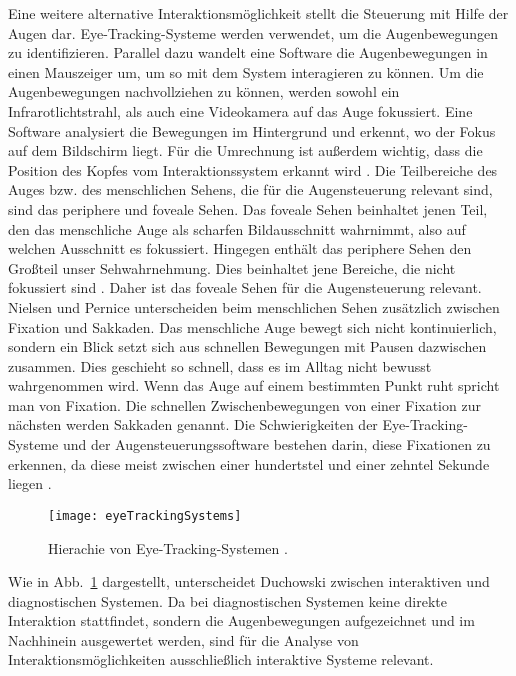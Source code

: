 Eine weitere alternative Interaktionsmöglichkeit stellt die Steuerung mit Hilfe der Augen dar. Eye-Tracking-Systeme werden verwendet, um die Augenbewegungen zu identifizieren. Parallel dazu wandelt eine Software die Augenbewegungen in einen Mauszeiger um, um so mit dem System interagieren zu können. 
\newline \newline
Um die Augenbewegungen nachvollziehen zu können, werden sowohl ein Infrarotlichtstrahl, als auch eine Videokamera auf das Auge fokussiert. Eine Software analysiert die Bewegungen im Hintergrund und erkennt, wo der Fokus auf dem Bildschirm liegt. Für die Umrechnung ist außerdem wichtig, dass die Position des Kopfes vom Interaktionssystem erkannt wird \cite{NielsenPernice}.
\newline \newline
Die Teilbereiche des Auges bzw. des menschlichen Sehens, die für die Augensteuerung relevant sind, sind das periphere und foveale Sehen. Das foveale Sehen beinhaltet jenen Teil, den das menschliche Auge als scharfen Bildausschnitt wahrnimmt, also auf \mbox{welchen} Ausschnitt es fokussiert. Hingegen enthält das periphere Sehen den Großteil unser Sehwahrnehmung. Dies beinhaltet jene Bereiche, die nicht fokussiert sind \cite{NielsenPernice}. Daher ist das foveale Sehen für die Augensteuerung relevant.
\newline \newline
Nielsen und Pernice \cite{NielsenPernice} unterscheiden beim menschlichen Sehen zusätzlich zwischen Fixation und Sakkaden. Das menschliche Auge bewegt sich nicht kontinuierlich, sondern ein Blick setzt sich aus schnellen Bewegungen mit Pausen dazwischen zusammen. Dies geschieht so schnell, dass es im Alltag nicht bewusst wahrgenommen wird. Wenn das Auge auf einem bestimmten Punkt ruht spricht man von Fixation. Die schnellen Zwischenbewegungen von einer Fixation zur nächsten werden Sakkaden genannt. Die Schwierigkeiten der Eye-Tracking-Systeme und der Augensteuerungssoftware bestehen darin, diese Fixationen zu erkennen, da diese meist zwischen einer hundertstel und einer zehntel Sekunde liegen \cite{NielsenPernice}.
\begin{figure}
\centering
\texttt{[image: eyeTrackingSystems]}
\caption{Hierachie von Eye-Tracking-Systemen \cite{Duchowski}.}
\label{fig:eyeTrackingSystems}
\end{figure}
\newline \newline
Wie in Abb.~\ref{fig:eyeTrackingSystems} dargestellt, unterscheidet Duchowski \cite{Duchowski} zwischen interaktiven und \mbox{diagnostischen} Systemen. Da bei diagnostischen Systemen keine direkte Interaktion stattfindet, sondern die Augenbewegungen aufgezeichnet und im Nachhinein ausgewertet werden, sind für die Analyse von Interaktionsmöglichkeiten ausschließlich interaktive Systeme relevant. 
